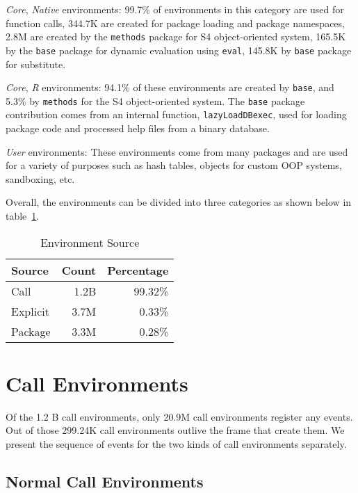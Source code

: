 \documentclass[10pt,review,sigplan,anonymous=true,authorversion=true,nonacm=true]{acmart}
\newcommand{\code}[1]{\lstinline |#1|\xspace}
\begin{document}
\emph{Core}, \emph{Native} environments: 99.7\% of environments in this category
are used for function calls, 344.7K are created for package loading and package
namespaces, 2.8M are created by the \code{methods} package for S4
object-oriented system, 165.5K by the \code{base} package for dynamic evaluation
using \code{eval}, 145.8K by \code{base} package for substitute.

\emph{Core}, \emph{R} environments: 94.1\% of these environments are created by
\code{base}, and 5.3\% by \code{methods} for the S4 object-oriented system. The
\code{base} package contribution comes from an internal function,
\code{lazyLoadDBexec}, used for loading package code and processed help files
from a binary database.

\emph{User} environments: These environments come from many packages and are
used for a variety of purposes such as hash tables, objects for custom OOP
systems, sandboxing, etc.

Overall, the environments can be divided into three categories as shown below in
table~\ref{table:env_category}.

\begin{table}
  \vspace{-3mm}
  \small
  \caption{Environment Source} \label{table:env_category}
  \centering
  \begin{tabular}{l|rr}
    \toprule
    \textbf{Source}&\textbf{Count}&\textbf{Percentage}\\
    \midrule
    Call&1.2B&99.32\%\\
    Explicit&3.7M&0.33\%\\
    Package&3.3M&0.28\%\\
    \bottomrule
  \end{tabular}
\end{table}

\section{Call Environments}


Of the 1.2 B call environments, only 20.9M call environments register any
events. Out of those 299.24K call environments outlive the frame that create
them. We present the sequence of events for the two kinds of call environments
separately.

\subsection{Normal Call Environments}
\end{document}
